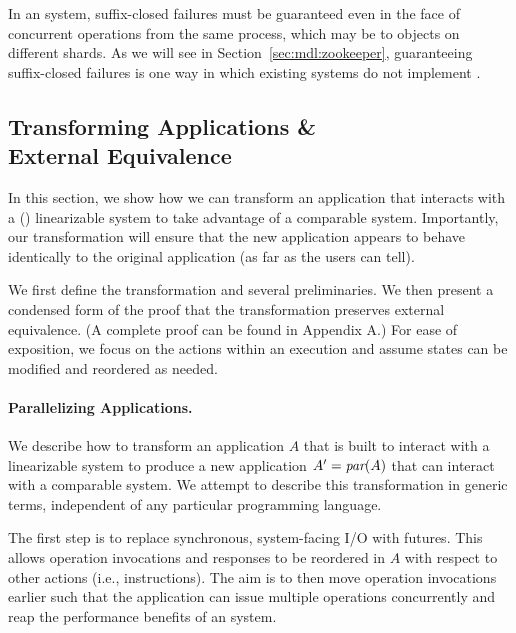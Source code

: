 In an \MDL{} system, suffix-closed failures must be guaranteed even in the
face of concurrent operations from the same process, which may be to
objects on different shards. As we will see in Section~\ref{sec:mdl:zookeeper},
guaranteeing suffix-closed failures is one way in which existing systems do not implement \mdl{}.  


\subsection{Transforming Applications \& \\External Equivalence}
\label{sec:mdl:equivalence}

In this section, we show how we can transform an application that interacts with
a (\singledispatch{}) linearizable system to take advantage of a comparable
\multidispatch{} system. Importantly, our transformation will ensure that the new
application appears to behave identically to the original application (as far as
the users can tell).

We first define the transformation and several preliminaries. We then
present a condensed form of the proof that the transformation preserves external
equivalence. (A complete proof can be found in Appendix A.) %
For ease of exposition, we focus on the actions within an
execution and assume states can be modified and reordered as needed.

\paragraph{Parallelizing Applications.}
\label{sec:mdl:transform}

We describe how to transform an application $A$ that is built to
interact with a linearizable system to produce a new application
$A^\prime = \operatorname*{\textit{par}}(A)$ that can interact with a comparable \MDL{} system.
We attempt to describe this transformation in generic terms, independent of any particular programming language.

The first step is to replace synchronous, system-facing I/O with
futures. This allows operation invocations and responses
to be reordered in $A$ with respect to other actions (i.e., instructions).
The aim is to then move operation invocations earlier such that the application
can issue multiple operations concurrently and reap the performance benefits 
of an \MDL{} system.

